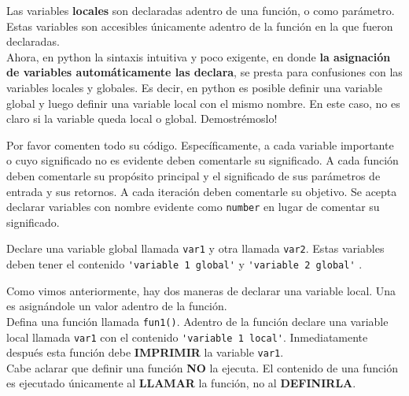 \documentclass[11pt,letterpaper]{exam}
\begin{document}
Las variables \textbf{locales} son declaradas adentro de una funci\'on, o como par\'ametro. Estas variables son accesibles \'unicamente adentro de la funci\'on en la que fueron declaradas.\\

Ahora, en python la sintaxis intuitiva y poco exigente, en donde \textbf{la asignaci\'on de variables autom\'aticamente las declara}, se presta para confusiones con las variables locales y globales. Es decir, en python es posible definir una variable global y luego definir una variable local con el mismo nombre. En este caso, no es claro si la variable queda local o global. Demostr\'emoslo!\\

\begin{questions}


Por favor comenten todo su c\'odigo. Espec\'ificamente, a cada variable importante o cuyo significado no es evidente deben comentarle su significado. A cada funci\'on deben comentarle su prop\'osito principal y el significado de sus par\'ametros de entrada y sus retornos. A cada iteraci\'on deben comentarle su objetivo. Se acepta declarar variables con nombre evidente como \verb"number" en lugar de comentar su significado.


Declare una variable global llamada \verb"var1" y otra llamada \verb"var2". Estas variables deben tener el contenido \verb"'variable 1 global'" y \verb"'variable 2 global'" .


Como vimos anteriormente, hay dos maneras de declarar una variable local. Una es asign\'andole un valor adentro de la funci\'on. \\

Defina una funci\'on llamada \verb"fun1()". Adentro de la funci\'on declare una variable local llamada \verb"var1" con el contenido \verb"'variable 1 local'". Inmediatamente despu\'es esta funci\'on debe \textbf{IMPRIMIR} la variable \verb"var1".\\

Cabe aclarar que definir una funci\'on \textbf{NO} la ejecuta. El contenido de una funci\'on es ejecutado \'unicamente al \textbf{LLAMAR} la funci\'on, no al \textbf{DEFINIRLA}.



\end{questions}
\end{document}
